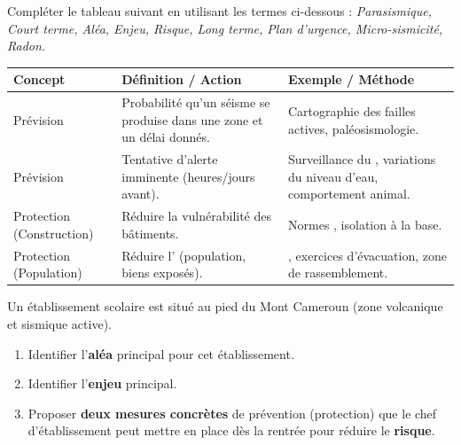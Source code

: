 \documentclass[11pt]{article}
\begin{document}
\begin{exercice}
Compléter le tableau suivant en utilisant les termes ci-dessous :
\textit{Parasismique, Court terme, Aléa, Enjeu, Risque, Long terme, Plan d'urgence, Micro-sismicité, Radon.}

\begin{tabular}{|p{3.5cm}|p{5.5cm}|p{5.5cm}|}
\hline
\textbf{Concept} & \textbf{Définition / Action} & \textbf{Exemple / Méthode} \\
\hline
Prévision \underline{\hspace{2cm}} & Probabilité qu'un séisme se produise dans une zone et un délai donnés. & Cartographie des failles actives, paléosismologie. \\
\hline
Prévision \underline{\hspace{2cm}} & Tentative d'alerte imminente (heures/jours avant). & Surveillance du \underline{\hspace{2cm}}, variations du niveau d'eau, comportement animal. \\
\hline
Protection (Construction) & Réduire la vulnérabilité des bâtiments. & Normes \underline{\hspace{2cm}}, isolation à la base. \\
\hline
Protection (Population) & Réduire l'\underline{\hspace{2cm}} (population, biens exposés). & \underline{\hspace{2cm}}, exercices d'évacuation, zone de rassemblement. \\
\hline
\end{tabular}
\end{exercice}

\begin{exercice}
Un établissement scolaire est situé au pied du Mont Cameroun (zone volcanique et sismique active).
\begin{enumerate}
    \item Identifier l'\textbf{aléa} principal pour cet établissement.
    \item Identifier l'\textbf{enjeu} principal.
    \item Proposer \textbf{deux mesures concrètes} de prévention (protection) que le chef d'établissement peut mettre en place dès la rentrée pour réduire le \textbf{risque}.
\end{enumerate}
\end{exercice}
\end{document}
